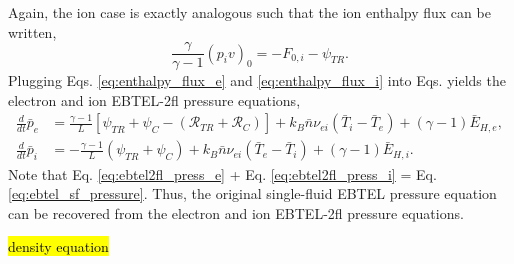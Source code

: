 Again, the ion case is exactly analogous such that the ion enthalpy flux can be written,
\begin{equation}
	\label{eq:enthalpy_flux_i}
	\frac{\gamma}{\gamma - 1}(p_iv)_0 =  - F_{0,i} - \psi_{TR}.
\end{equation}
Plugging Eqs. \ref{eq:enthalpy_flux_e} and \ref{eq:enthalpy_flux_i} into Eqs. yields the electron and ion EBTEL-2fl pressure equations,
\begin{align}
	\frac{d}{dt}\bar{p}_e &= \frac{\gamma - 1}{L}[\psi_{TR} + \psi_C -(\mathcal{R}_{TR} + \mathcal{R}_C)] + k_B\bar{n}\nu_{ei}(\bar{T}_i-\bar{T}_e) + (\gamma-1)\bar{E}_{H,e},\label{eq:ebtel2fl_press_e} \\[0.5em]
	\frac{d}{dt}\bar{p}_i &= -\frac{\gamma - 1}{L}(\psi_{TR} + \psi_C) + k_B\bar{n}\nu_{ei}(\bar{T}_e-\bar{T}_i) + (\gamma-1)\bar{E}_{H,i}.\label{eq:ebtel2fl_press_i}
\end{align}
Note that Eq. \ref{eq:ebtel2fl_press_e} + Eq. \ref{eq:ebtel2fl_press_i} = Eq. \ref{eq:ebtel_sf_pressure}. Thus, the original single-fluid EBTEL pressure equation can be recovered from the electron and ion EBTEL-2fl pressure equations.
%
\par \hl{density equation}
%
